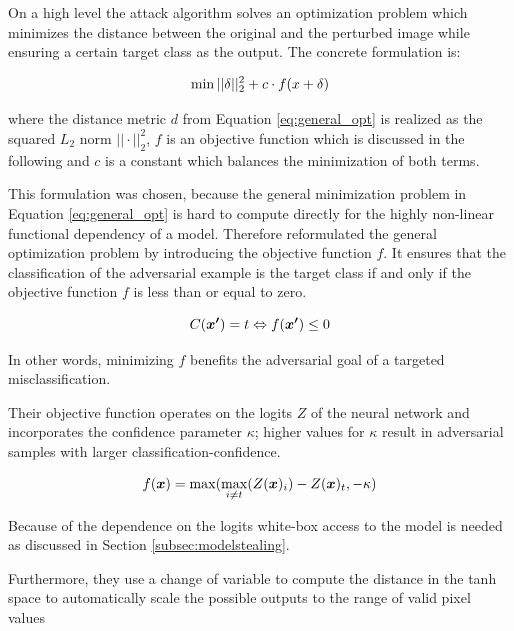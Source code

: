 On a high level the attack algorithm solves an optimization problem which minimizes the distance between the original and the perturbed image while ensuring a certain target class as the output. The concrete formulation is:

\begin{equation}\label{eq:cw_general}
\min ||\delta||^2_2 + c \cdot f(x + \delta)
\vspace{1ex}
\end{equation}

where the distance metric $d$ from Equation \ref{eq:general_opt} is realized as the squared $L_2$ norm $||\cdot||^2_2$, $f$ is an objective function which is discussed in the following and $c$ is a constant which balances the minimization of both terms.

This formulation was chosen, because the general minimization problem in Equation \ref{eq:general_opt} is hard to compute directly for the highly non-linear functional dependency of a model. Therefore \citeauthor{carlini2017towards} reformulated the general optimization problem by introducing the objective function $f$.
It ensures that the classification of the adversarial example is the target class if and only if the objective function $f$ is less than or equal to zero.

\begin{equation*}
C(\myvec{x'}) = t \Leftrightarrow f(\myvec{x'}) \leq 0
\vspace{1ex}
\end{equation*}

In other words, minimizing $f$ benefits the adversarial goal of a targeted misclassification.

Their objective function operates on the logits $Z$ of the neural network and incorporates the confidence parameter $\kappa$; higher values for $\kappa$ result in adversarial samples with larger classification-confidence.

\begin{equation*}
f(\boldsymbol{x}) = \max(\underset{i\neq t}{\max}(Z(\boldsymbol{x})_i) - Z(\boldsymbol{x})_t, -\kappa)
\end{equation*}

Because of the dependence on the logits white-box access to the model is needed as discussed in Section \ref{subsec:modelstealing}.

Furthermore, they use a change of variable to compute the distance in the tanh space to automatically scale the possible outputs to the range of valid pixel values

